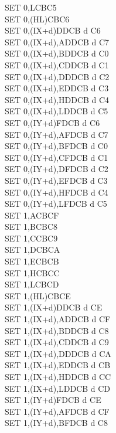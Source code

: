 \documentclass[12pt,twoside,openright,a4paper]{book}
\begin{document}
\begin{multicols}{3}
{\begin{tabbing}
		SET 0,L\>CBC5\\
		SET 0,(HL)\>CBC6\\
		SET 0,(IX+d)\>DDCB d C6\\
		SET 0,(IX+d),A\UNDOC\>DDCB d C7\\
		SET 0,(IX+d),B\UNDOC\>DDCB d C0\\
		SET 0,(IX+d),C\UNDOC\>DDCB d C1\\
		SET 0,(IX+d),D\UNDOC\>DDCB d C2\\
		SET 0,(IX+d),E\UNDOC\>DDCB d C3\\
		SET 0,(IX+d),H\UNDOC\>DDCB d C4\\
		SET 0,(IX+d),L\UNDOC\>DDCB d C5\\
		SET 0,(IY+d)\>FDCB d C6\\
		SET 0,(IY+d),A\UNDOC\>FDCB d C7\\
		SET 0,(IY+d),B\UNDOC\>FDCB d C0\\
		SET 0,(IY+d),C\UNDOC\>FDCB d C1\\
		SET 0,(IY+d),D\UNDOC\>FDCB d C2\\
		SET 0,(IY+d),E\UNDOC\>FDCB d C3\\
		SET 0,(IY+d),H\UNDOC\>FDCB d C4\\
		SET 0,(IY+d),L\UNDOC\>FDCB d C5\\
		SET 1,A\>CBCF\\
		SET 1,B\>CBC8\\
		SET 1,C\>CBC9\\
		SET 1,D\>CBCA\\
		SET 1,E\>CBCB\\
		SET 1,H\>CBCC\\
		SET 1,L\>CBCD\\
		SET 1,(HL)\>CBCE\\
		SET 1,(IX+d)\>DDCB d CE\\
		SET 1,(IX+d),A\UNDOC\>DDCB d CF\\
		SET 1,(IX+d),B\UNDOC\>DDCB d C8\\
		SET 1,(IX+d),C\UNDOC\>DDCB d C9\\
		SET 1,(IX+d),D\UNDOC\>DDCB d CA\\
		SET 1,(IX+d),E\UNDOC\>DDCB d CB\\
		SET 1,(IX+d),H\UNDOC\>DDCB d CC\\
		SET 1,(IX+d),L\UNDOC\>DDCB d CD\\
		SET 1,(IY+d)\>FDCB d CE\\
		SET 1,(IY+d),A\UNDOC\>FDCB d CF\\
		SET 1,(IY+d),B\UNDOC\>FDCB d C8\\

\end{tabbing}}
\end{multicols}
\end{document}
